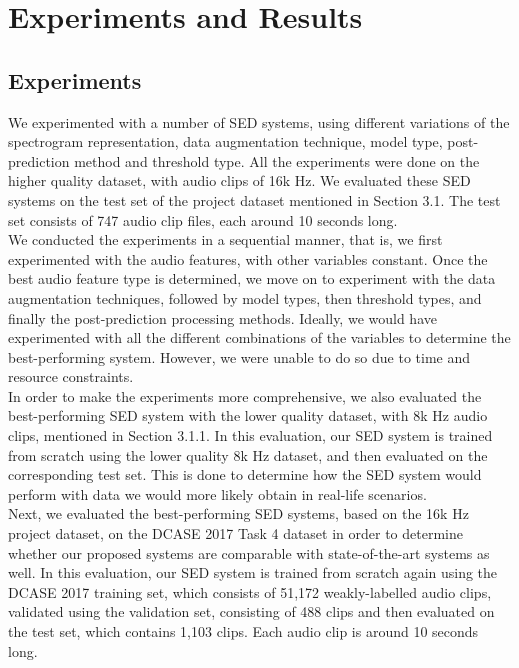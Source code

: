 
\chapter{Experiments and Results}

\section{Experiments}
We experimented with a number of SED systems, using different variations of the spectrogram representation, data augmentation technique, model type,  post-prediction method and threshold type. All the experiments were done on the higher quality dataset, with audio clips of 16k Hz. We evaluated these SED systems on the test set of the project dataset mentioned in Section 3.1. The test set consists of 747 audio clip files, each around 10 seconds long.\\ 

We conducted the experiments in a sequential manner, that is, we first experimented with the audio features, with other variables constant. Once the best audio feature type is determined, we move on to experiment with the data augmentation techniques, followed by model types, then threshold types, and finally the post-prediction processing methods. Ideally, we would have experimented with all the different combinations of the variables to determine the best-performing system. However, we were unable to do so due to time and resource constraints.\\ 

In order to make the experiments more comprehensive, we also evaluated the best-performing SED system with the lower quality dataset, with 8k Hz audio clips, mentioned in Section 3.1.1. In this evaluation, our SED system is trained from scratch using the lower quality 8k Hz dataset, and then evaluated on the corresponding test set. This is done to determine how the SED system would perform with data we would more likely obtain in real-life scenarios.\\

Next, we evaluated the best-performing SED systems, based on the 16k Hz project dataset, on the DCASE 2017 Task 4 dataset in order to determine whether our proposed systems are comparable with state-of-the-art systems as well. In this evaluation, our SED system is trained from scratch again using the DCASE 2017 training set, which consists of 51,172 weakly-labelled audio clips, validated using the validation set, consisting of 488 clips and then evaluated on the test set, which contains 1,103 clips. Each audio clip is around 10 seconds long.\\

